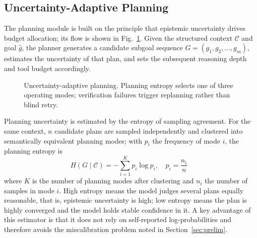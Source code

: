 \documentclass[journal,10pt,a4paper]{IEEEtran}
\begin{document}
\subsection{Uncertainty-Adaptive Planning}
\label{sec:planning}
The planning module is built on the principle that epistemic uncertainty drives budget allocation; its flow is shown in Fig.~\ref{fig:planning}. Given the structured context $\mathcal{C}$ and goal $\hat{g}$, the planner generates a candidate subgoal sequence $G=(g_1,g_2,\dots,g_m)$, estimates the uncertainty of that plan, and sets the subsequent reasoning depth and tool budget accordingly.

\begin{figure}[t]
\centering
{}
\caption{Uncertainty-adaptive planning. Planning entropy selects one of three operating modes; verification failures trigger replanning rather than blind retry.}
\label{fig:planning}
\end{figure}

Planning uncertainty is estimated by the entropy of sampling agreement. For the same context, $n$ candidate plans are sampled independently and clustered into semantically equivalent planning modes; with $p_i$ the frequency of mode $i$, the planning entropy is
\begin{equation}
H(G\mid\mathcal{C})=-\sum_{i=1}^{K}p_i\log p_i,\quad p_i=\frac{n_i}{n}
\end{equation}
where $K$ is the number of planning modes after clustering and $n_i$ the number of samples in mode $i$. High entropy means the model judges several plans equally reasonable, that is, epistemic uncertainty is high; low entropy means the plan is highly converged and the model holds stable confidence in it. A key advantage of this estimator is that it does not rely on self-reported log-probabilities and therefore avoids the miscalibration problem noted in Section~\ref{sec:prelim}.
\end{document}

